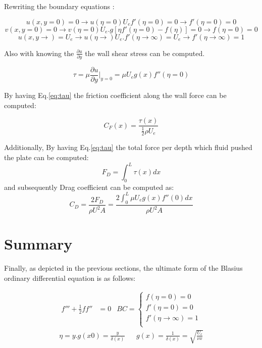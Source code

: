 \documentclass[]{report}
\begin{document}
Rewriting the boundary equations :

\begin{equation}
u(x,y=0)=0 \longrightarrow u(\eta = 0) U_e f'(\eta=0) = 0 \longrightarrow f'(\eta=0) = 0 
\end{equation}
\begin{equation}
v(x,y=0)= 0 \longrightarrow v(\eta = 0) U_e.g [\eta f'(\eta=0) - f(\eta)] = 0 \longrightarrow f(\eta=0) = 0 
\end{equation}
\begin{equation}
u(x,y\rightarrow) = U_e \longrightarrow u(\eta\rightarrow) U_e.f'(\eta \rightarrow \infty) = U_e \longrightarrow f'(\eta\rightarrow \infty)=1 
\end{equation}

Also with knowing the $\frac{\partial u}{\partial y}$ the wall shear stress can be computed.

\begin{equation}
\label{eq:tau}
    \tau = \mu \frac{\partial u}{\partial y}|_{y=0} = \mu U_e g(x) f''(\eta=0)
\end{equation}

By having Eq.\ref{eq:tau} the friction coefficient along the wall force can be computed:

\begin{equation}
\label{eq:CF}
    C_F(x) = \frac{\tau(x)}{\frac{1}{2}\rho U_{e}}
\end{equation}

Additionally, By having Eq.\ref{eq:tau} the total force per depth which fluid pushed the plate can be computed:
\begin{equation}
    F_D = \int_0^L \tau(x)dx
\end{equation}
and subsequently Drag coefficient can be computed as:
\begin{equation}
    C_D = \frac{2F_D}{\rho U^2 A} = \frac{2\int_0^L \mu U_e g(x) f''(0) dx}{\rho U^2 A} 
\end{equation}
\section{Summary}

Finally, as depicted in the previous sections, the ultimate form of the Blasius ordinary differential equation is as follows:

\begin{align}
    f''' + \frac{1}{2}ff'' &= 0 & BC =
    \begin{cases}
      f(\eta=0) = 0\\
      f'(\eta=0) = 0\\
    f'(\eta\rightarrow \infty)=1 \\
    \end{cases}
\end{align}
\begin{align}
\label{eq:eta}
\eta = y.g(x0) = \frac{y}{\delta(x)}&
&g(x) = \frac{1}{\delta(x)} = \sqrt{\frac{U_e}{\nu x}} 
\end{align}
\end{document}
